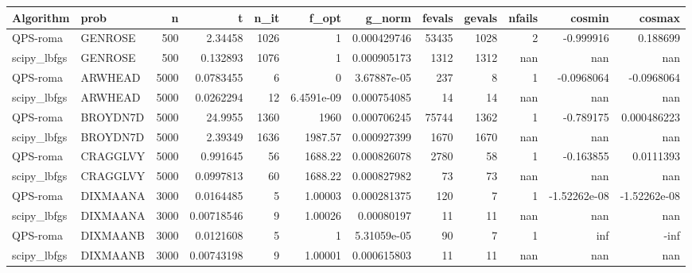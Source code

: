 \documentclass[a4paper]{article}
\begin{document}
\scriptsize

\begin{tabular}{llrrrrrrrrrr}
	\hline
	Algorithm   & prob     &     n &           t &   n\_it &            f\_opt &      g\_norm &   fevals &   gevals &   nfails &        cosmin &         cosmax \\
	\hline
	QPS-roma    & GENROSE  &   500 &  2.34458    &   1026 &      1           & 0.000429746 &    53435 &     1028 &        2 &  -0.999916    &    0.188699    \\
	scipy\_lbfgs & GENROSE  &   500 &  0.132893   &   1076 &      1           & 0.000905173 &     1312 &     1312 &      nan & nan           &  nan           \\
	QPS-roma    & ARWHEAD  &  5000 &  0.0783455  &      6 &      0           & 3.67887e-05 &      237 &        8 &        1 &  -0.0968064   &   -0.0968064   \\
	scipy\_lbfgs & ARWHEAD  &  5000 &  0.0262294  &     12 &      6.4591e-09  & 0.000754085 &       14 &       14 &      nan & nan           &  nan           \\
	QPS-roma    & BROYDN7D &  5000 & 24.9955     &   1360 &   1960           & 0.000706245 &    75744 &     1362 &        1 &  -0.789175    &    0.000486223 \\
	scipy\_lbfgs & BROYDN7D &  5000 &  2.39349    &   1636 &   1987.57        & 0.000927399 &     1670 &     1670 &      nan & nan           &  nan           \\
	QPS-roma    & CRAGGLVY &  5000 &  0.991645   &     56 &   1688.22        & 0.000826078 &     2780 &       58 &        1 &  -0.163855    &    0.0111393   \\
	scipy\_lbfgs & CRAGGLVY &  5000 &  0.0997813  &     60 &   1688.22        & 0.000827982 &       73 &       73 &      nan & nan           &  nan           \\
	QPS-roma    & DIXMAANA &  3000 &  0.0164485  &      5 &      1.00003     & 0.000281375 &      120 &        7 &        1 &  -1.52262e-08 &   -1.52262e-08 \\
	scipy\_lbfgs & DIXMAANA &  3000 &  0.00718546 &      9 &      1.00026     & 0.00080197  &       11 &       11 &      nan & nan           &  nan           \\
	QPS-roma    & DIXMAANB &  3000 &  0.0121608  &      5 &      1           & 5.31059e-05 &       90 &        7 &        1 & inf           & -inf           \\
	scipy\_lbfgs & DIXMAANB &  3000 &  0.00743198 &      9 &      1.00001     & 0.000615803 &       11 &       11 &      nan & nan           &  nan           \\

\end{tabular}
\end{document}
